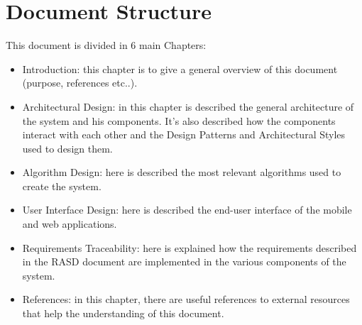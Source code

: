 \documentclass[../../../../dd.tex]{subfiles}
\begin{document}
	\section{Document Structure}
		This document is divided in 6 main Chapters:
		\begin{itemize}
			\item Introduction: this chapter is to give a general overview of this document (purpose, references etc..).
			\item Architectural Design: in this chapter is described the general architecture of the system and his components. It's also described how the components interact with each other and the Design Patterns and Architectural Styles used to design them.
			\item Algorithm Design: here is described the most relevant algorithms used to create the system.
			\item User Interface Design: here is described the end-user interface of the mobile and web applications.
			\item Requirements Traceability: here is explained how the requirements described in the RASD document are implemented in the various components of the system.
			\item References: in this chapter, there are useful references to external resources that help the understanding of this document. 
		\end{itemize}
\end{document}
